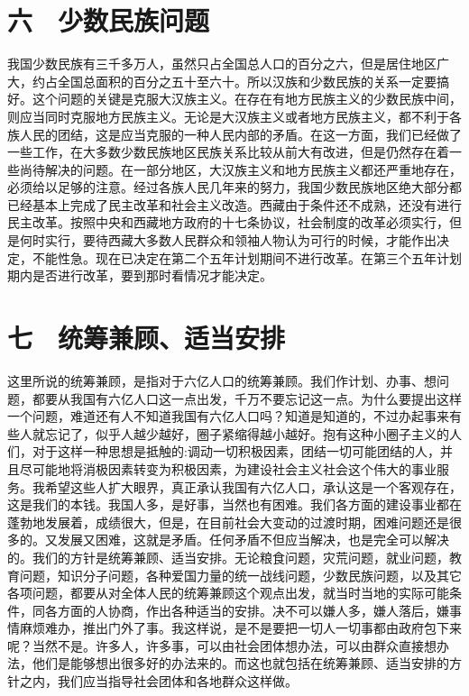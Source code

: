 \section{六　少数民族问题}

我国少数民族有三千多万人，虽然只占全国总人口的百分之六，但是居住地区广大，约占全国总面积的百分之五十至六十。所以汉族和少数民族的关系一定要搞好。这个问题的关键是克服大汉族主义。在存在有地方民族主义的少数民族中间，则应当同时克服地方民族主义。无论是大汉族主义或者地方民族主义，都不利于各族人民的团结，这是应当克服的一种人民内部的矛盾。在这一方面，我们已经做了一些工作，在大多数少数民族地区民族关系比较从前大有改进，但是仍然存在着一些尚待解决的问题。在一部分地区，大汉族主义和地方民族主义都还严重地存在，必须给以足够的注意。经过各族人民几年来的努力，我国少数民族地区绝大部分都已经基本上完成了民主改革和社会主义改造。西藏由于条件还不成熟，还没有进行民主改革。按照中央和西藏地方政府的十七条协议，社会制度的改革必须实行，但是何时实行，要待西藏大多数人民群众和领袖人物认为可行的时候，才能作出决定，不能性急。现在已决定在第二个五年计划期间不进行改革。在第三个五年计划期内是否进行改革，要到那时看情况才能决定。

\section{七　统筹兼顾、适当安排}

这里所说的统筹兼顾，是指对于六亿人口的统筹兼顾。我们作计划、办事、想问题，都要从我国有六亿人口这一点出发，千万不要忘记这一点。为什么要提出这样一个问题，难道还有人不知道我国有六亿人口吗？知道是知道的，不过办起事来有些人就忘记了，似乎人越少越好，圈子紧缩得越小越好。抱有这种小圈子主义的人们，对于这样一种思想是抵触的:调动一切积极因素，团结一切可能团结的人，并且尽可能地将消极因素转变为积极因素，为建设社会主义社会这个伟大的事业服务。我希望这些人扩大眼界，真正承认我国有六亿人口，承认这是一个客观存在，这是我们的本钱。我国人多，是好事，当然也有困难。我们各方面的建设事业都在蓬勃地发展着，成绩很大，但是，在目前社会大变动的过渡时期，困难问题还是很多的。又发展又困难，这就是矛盾。任何矛盾不但应当解决，也是完全可以解决的。我们的方针是统筹兼顾、适当安排。无论粮食问题，灾荒问题，就业问题，教育问题，知识分子问题，各种爱国力量的统一战线问题，少数民族问题，以及其它各项问题，都要从对全体人民的统筹兼顾这个观点出发，就当时当地的实际可能条件，同各方面的人协商，作出各种适当的安排。决不可以嫌人多，嫌人落后，嫌事情麻烦难办，推出门外了事。我这样说，是不是要把一切人一切事都由政府包下来呢？当然不是。许多人，许多事，可以由社会团体想办法，可以由群众直接想办法，他们是能够想出很多好的办法来的。而这也就包括在统筹兼顾、适当安排的方针之内，我们应当指导社会团体和各地群众这样做。

